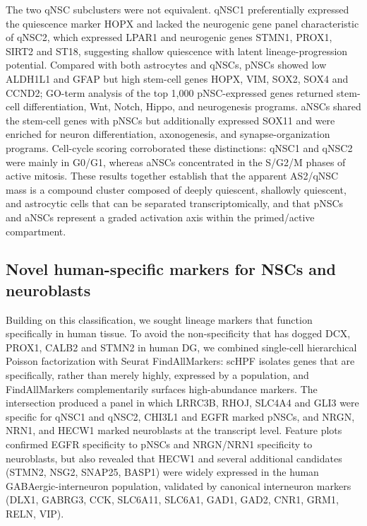 \documentclass[11pt]{article}
\begin{document}
The two qNSC subclusters were not equivalent. qNSC1 preferentially expressed
the quiescence marker HOPX and lacked the neurogenic gene panel
characteristic of qNSC2, which expressed LPAR1 and neurogenic genes STMN1,
PROX1, SIRT2 and ST18, suggesting shallow quiescence with latent
lineage-progression potential. Compared with both astrocytes and qNSCs,
pNSCs showed low ALDH1L1 and GFAP but high stem-cell genes HOPX, VIM,
SOX2, SOX4 and CCND2; GO-term analysis of the top 1{,}000 pNSC-expressed
genes returned stem-cell differentiation, Wnt, Notch, Hippo, and
neurogenesis programs. aNSCs shared the stem-cell genes with pNSCs but
additionally expressed SOX11 and were enriched for neuron differentiation,
axonogenesis, and synapse-organization programs. Cell-cycle scoring
corroborated these distinctions: qNSC1 and qNSC2 were mainly in G0/G1,
whereas aNSCs concentrated in the S/G2/M phases of active mitosis. These
results together establish that the apparent AS2/qNSC mass is a compound
cluster composed of deeply quiescent, shallowly quiescent, and astrocytic
cells that can be separated transcriptomically, and that pNSCs and aNSCs
represent a graded activation axis within the primed/active compartment.

\subsection{Novel human-specific markers for NSCs and neuroblasts}

Building on this classification, we sought lineage markers that function
specifically in human tissue. To avoid the non-specificity that has dogged
DCX, PROX1, CALB2 and STMN2 in human DG, we combined single-cell
hierarchical Poisson factorization \cite{levitin2019gene} with Seurat
FindAllMarkers: scHPF isolates genes that are specifically, rather than
merely highly, expressed by a population, and FindAllMarkers
complementarily surfaces high-abundance markers. The intersection produced
a panel in which LRRC3B, RHOJ, SLC4A4 and GLI3 were specific for qNSC1 and
qNSC2, CHI3L1 and EGFR marked pNSCs, and NRGN, NRN1, and HECW1 marked
neuroblasts at the transcript level. Feature plots confirmed EGFR
specificity to pNSCs and NRGN/NRN1 specificity to neuroblasts, but also
revealed that HECW1 and several additional candidates (STMN2, NSG2, SNAP25,
BASP1) were widely expressed in the human GABAergic-interneuron population,
validated by canonical interneuron markers (DLX1, GABRG3, CCK, SLC6A11,
SLC6A1, GAD1, GAD2, CNR1, GRM1, RELN, VIP).
\end{document}
